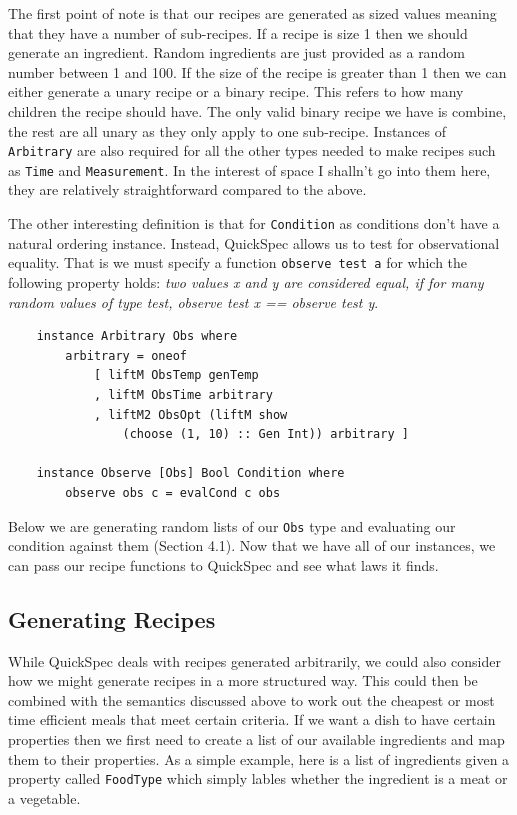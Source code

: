 \documentclass[11pt]{article}
\begin{document}
The first point of note is that our recipes are generated as sized values meaning
that they have a number of sub-recipes. If a recipe is size 1 then we should generate
an ingredient. Random ingredients are just provided as a random number between 1 and 100.
If the size of the recipe is greater than 1 then we can either generate a unary recipe
or a binary recipe. This refers to how many children the recipe should have. The only
valid binary recipe we have is combine, the rest are all unary as they only apply to
one sub-recipe. Instances of \texttt{Arbitrary} are also required for all the other types
needed to make recipes such as \texttt{Time} and \texttt{Measurement}. In the interest
of space I shalln't go into them here, they are relatively straightforward compared to
the above.

\medbreak

The other interesting definition is that for \texttt{Condition} as conditions don't
have a natural ordering instance. Instead, QuickSpec allows us to test for observational
equality. That is we must specify a function \texttt{observe test a} for which the
following property holds: \textit{two values x and y are considered equal,
if for many random values of type test, observe test x == observe test y}.

\begin{lstlisting}
    instance Arbitrary Obs where
        arbitrary = oneof
            [ liftM ObsTemp genTemp
            , liftM ObsTime arbitrary
            , liftM2 ObsOpt (liftM show
                (choose (1, 10) :: Gen Int)) arbitrary ]

    instance Observe [Obs] Bool Condition where
        observe obs c = evalCond c obs
\end{lstlisting}

Below we are generating random lists of our \texttt{Obs} type and evaluating our
condition against them (Section 4.1). Now that we have all of our instances,
we can pass our recipe functions to QuickSpec and see what laws it finds.

\subsection{Generating Recipes}

While QuickSpec deals with recipes generated arbitrarily, we could also
consider how we might generate recipes in a more structured way. This could
then be combined with the semantics discussed above to work out the cheapest
or most time efficient meals that meet certain criteria. If we want a dish
to have certain properties then we first need to create a list of our
available ingredients and map them to their properties. As a simple
example, here is a list of ingredients given a property called
\texttt{FoodType} which simply lables whether the ingredient is a meat
or a vegetable.
\end{document}
